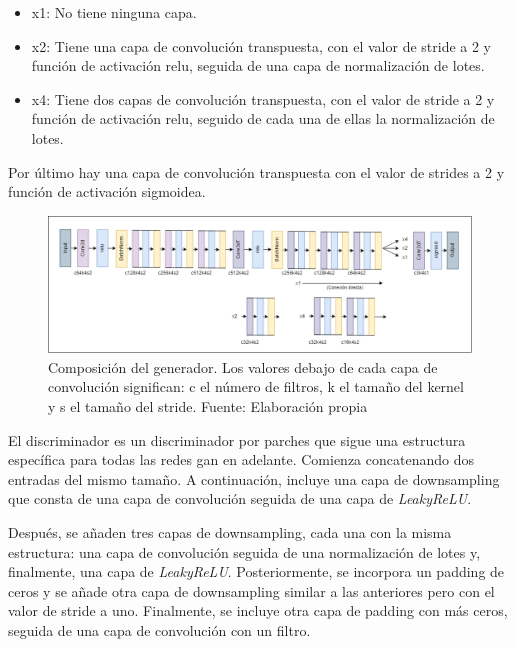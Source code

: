 \begin{itemize}
	\item x1: No tiene ninguna capa.
	\item x2: Tiene una capa de convolución transpuesta, con el valor de stride a 2 y función de activación relu, seguida de una capa de normalización de lotes.
	\item x4: Tiene dos capas de convolución transpuesta, con el valor de stride a 2 y función de activación relu, seguido de cada una de ellas la normalización de lotes.
\end{itemize}

Por último hay una capa de convolución transpuesta con el valor de strides a 2 y función de activación sigmoidea.

\begin{figure}[H]
	\centering
	\includegraphics[width=1\textwidth]{figures/Generador_normal.png}
	\caption{\label{fig:gan}Composición del generador. Los valores debajo de cada capa de convolución significan: c el número de filtros, k el tamaño del kernel y s el tamaño del stride. Fuente: Elaboración propia}
\end{figure}


El discriminador es un discriminador por parches que sigue una estructura específica para todas las redes \gls{gan} en adelante. Comienza concatenando dos entradas del mismo tamaño. A continuación, incluye una capa de downsampling que consta de una capa de convolución seguida de una capa de \textit{LeakyReLU}.

Después, se añaden tres capas de downsampling, cada una con la misma estructura: una capa de convolución seguida de una normalización de lotes y, finalmente, una capa de \textit{LeakyReLU}. Posteriormente, se incorpora un padding de ceros y se añade otra capa de downsampling similar a las anteriores pero con el valor de stride a uno. Finalmente, se incluye otra capa de padding con más ceros, seguida de una capa de convolución con un filtro.

